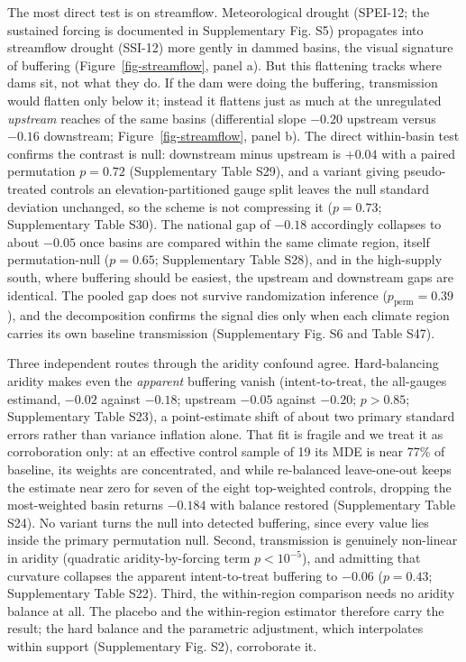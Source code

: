 \documentclass[
]{agujournal2019}
\begin{document}
The most direct test is on streamflow. Meteorological drought (SPEI-12;
the sustained forcing is documented in Supplementary Fig. S5) propagates
into streamflow drought (SSI-12) more gently in dammed basins, the
visual signature of buffering (Figure~\ref{fig-streamflow}, panel a).
But this flattening tracks where dams sit, not what they do. If the dam
were doing the buffering, transmission would flatten only below it;
instead it flattens just as much at the unregulated \emph{upstream}
reaches of the same basins (differential slope \(-0.20\) upstream versus
\(-0.16\) downstream; Figure~\ref{fig-streamflow}, panel b). The direct
within-basin test confirms the contrast is null: downstream minus
upstream is \(+0.04\) with a paired permutation \(p = 0.72\)
(Supplementary Table S29), and a variant giving pseudo-treated controls
an elevation-partitioned gauge split leaves the null standard deviation
unchanged, so the scheme is not compressing it (\(p = 0.73\);
Supplementary Table S30). The national gap of \(-0.18\) accordingly
collapses to about \(-0.05\) once basins are compared within the same
climate region, itself permutation-null (\(p = 0.65\); Supplementary
Table S28), and in the high-supply south, where buffering should be
easiest, the upstream and downstream gaps are identical. The pooled gap
does not survive randomization inference (\(p_{\text{perm}} = 0.39\)),
and the decomposition confirms the signal dies only when each climate
region carries its own baseline transmission (Supplementary Fig. S6 and
Table S47).

Three independent routes through the aridity confound agree.
Hard-balancing aridity makes even the \emph{apparent} buffering vanish
(intent-to-treat, the all-gauges estimand, \(-0.02\) against \(-0.18\);
upstream \(-0.05\) against \(-0.20\); \(p > 0.85\); Supplementary Table
S23), a point-estimate shift of about two primary standard errors rather
than variance inflation alone. That fit is fragile and we treat it as
corroboration only: at an effective control sample of 19 its MDE is near
77\% of baseline, its weights are concentrated, and while re-balanced
leave-one-out keeps the estimate near zero for seven of the eight
top-weighted controls, dropping the most-weighted basin returns
\(-0.184\) with balance restored (Supplementary Table S24). No variant
turns the null into detected buffering, since every value lies inside
the primary permutation null. Second, transmission is genuinely
non-linear in aridity (quadratic aridity-by-forcing term
\(p < 10^{-5}\)), and admitting that curvature collapses the apparent
intent-to-treat buffering to \(-0.06\) (\(p = 0.43\); Supplementary
Table S22). Third, the within-region comparison needs no aridity balance
at all. The placebo and the within-region estimator therefore carry the
result; the hard balance and the parametric adjustment, which
interpolates within support (Supplementary Fig. S2), corroborate it.
\end{document}
